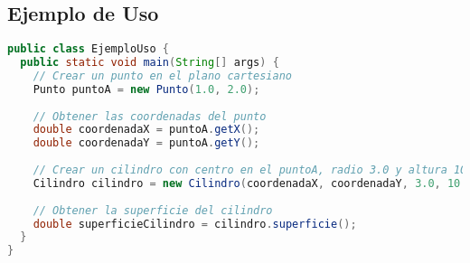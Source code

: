 \subsection{Ejemplo de Uso}
\begin{lstlisting}[language=Java]
public class EjemploUso {
  public static void main(String[] args) {
    // Crear un punto en el plano cartesiano
    Punto puntoA = new Punto(1.0, 2.0);
    
    // Obtener las coordenadas del punto
    double coordenadaX = puntoA.getX();
    double coordenadaY = puntoA.getY();
    
    // Crear un cilindro con centro en el puntoA, radio 3.0 y altura 10.0
    Cilindro cilindro = new Cilindro(coordenadaX, coordenadaY, 3.0, 10.0);
    
    // Obtener la superficie del cilindro
    double superficieCilindro = cilindro.superficie();
  }
}
\end{lstlisting}
